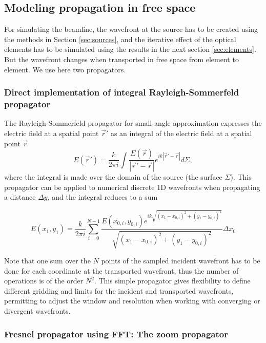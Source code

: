 \documentclass{iucr}              %
\begin{document}
\subsection{Modeling propagation in free space}
\label{sec:propagation}

For simulating the beamline, the wavefront at the source has to be created using the methods in Section \ref{sec:sources}, and the iterative effect of the optical elements has to be simulated using the results in the next section \ref{sec:elements}. But the wavefront changes when transported in free space from element to element. We use here two propagators. 

\subsubsection{Direct implementation of integral Rayleigh-Sommerfeld propagator}
\label{sec:integralPropagator}
%
The Rayleigh-Sommerfeld propagator for small-angle approximation expresses the electric field at a spatial point $\vec{r}'$ as an integral of the electric field at a spatial point $\vec{r}$ \cite{goodmanfourier}
\begin{equation}\label{eq:RSpropagator}
E(\vec{r}') =  \frac{k}{2 \pi i} \int \frac{E(\vec{r})}{|\vec{r}'-\vec{r}|} e^{ i k |\vec{r}' - \vec{r}|  }  d\Sigma,
\end{equation}
where the integral is made over the domain of the source (the surface $\Sigma$). 
This propagator can be applied to numerical discrete 1D wavefronts when propagating a distance $\Delta y$, and the integral reduces to a sum


\begin{equation}\label{eq:discreteRSpropagator}
E(x_1,y_1) = \frac{k}{2 \pi i}  \sum_{i=0}^{N-1}  \frac{E(x_{0,i},y_{0,i}) e^{i k \sqrt{(x_1 - x_{0,i})^2 + (y_1 - y_{0,i})^2} }}{\sqrt{(x_1 - x_{0,i})^2 + (y_1 - y_{0,i})^2}}  \Delta x_0
\end{equation}

Note that one sum over the $N$ points of the sampled incident wavefront has to be done for each coordinate at the transported wavefront, thus the number of operations is of the order $N^2$. This simple propagator gives flexibility to define different gridding and limits for the incident and transported wavefronts, permitting to adjust the window and resolution when working with converging or divergent wavefronts. 


\subsubsection{Fresnel propagator using FFT: The zoom propagator}
\label{sec:zoomPropagator}
\end{document}
